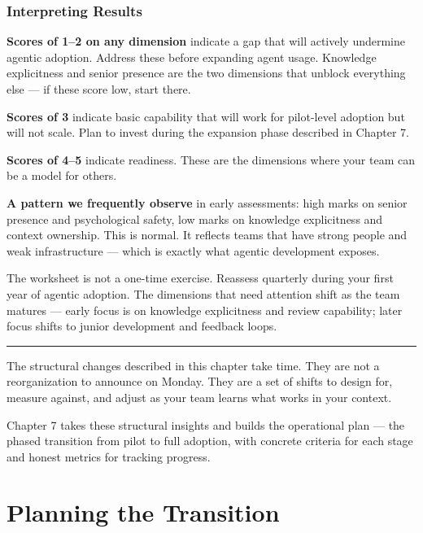 \documentclass[
  a4paper,
  DIV=11,
  numbers=noendperiod]{scrreprt}
\begin{document}
\subsection{Interpreting Results}\label{interpreting-results}

\textbf{Scores of 1--2 on any dimension} indicate a gap that will
actively undermine agentic adoption. Address these before expanding
agent usage. Knowledge explicitness and senior presence are the two
dimensions that unblock everything else --- if these score low, start
there.

\textbf{Scores of 3} indicate basic capability that will work for
pilot-level adoption but will not scale. Plan to invest during the
expansion phase described in Chapter 7.

\textbf{Scores of 4--5} indicate readiness. These are the dimensions
where your team can be a model for others.

\textbf{A pattern we frequently observe} in early assessments: high
marks on senior presence and psychological safety, low marks on
knowledge explicitness and context ownership. This is normal. It
reflects teams that have strong people and weak infrastructure --- which
is exactly what agentic development exposes.

The worksheet is not a one-time exercise. Reassess quarterly during your
first year of agentic adoption. The dimensions that need attention shift
as the team matures --- early focus is on knowledge explicitness and
review capability; later focus shifts to junior development and feedback
loops.

\begin{center}\rule{0.5\linewidth}{0.5pt}\end{center}

The structural changes described in this chapter take time. They are not
a reorganization to announce on Monday. They are a set of shifts to
design for, measure against, and adjust as your team learns what works
in your context.

Chapter 7 takes these structural insights and builds the operational
plan --- the phased transition from pilot to full adoption, with
concrete criteria for each stage and honest metrics for tracking
progress.

\chapter{Planning the Transition}\label{planning-the-transition}
\end{document}
